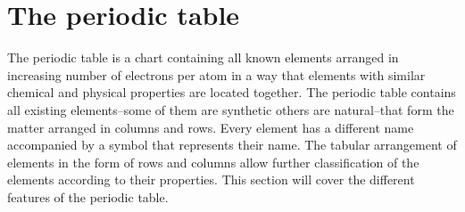 \documentclass[main.tex]{subfiles}
\begin{document}
\section{The periodic table}
The periodic table is a chart containing all known elements arranged in increasing number of electrons per atom in a way that elements with similar chemical and physical properties are located together. The periodic table contains all existing elements--some of them are synthetic others are natural--that form the matter arranged in columns and rows. Every element has a different name accompanied by a symbol that represents their name. The tabular arrangement of elements in the form of rows and columns allow further classification of the elements according to their properties. This section will cover the different features of the periodic table.
\end{document}

